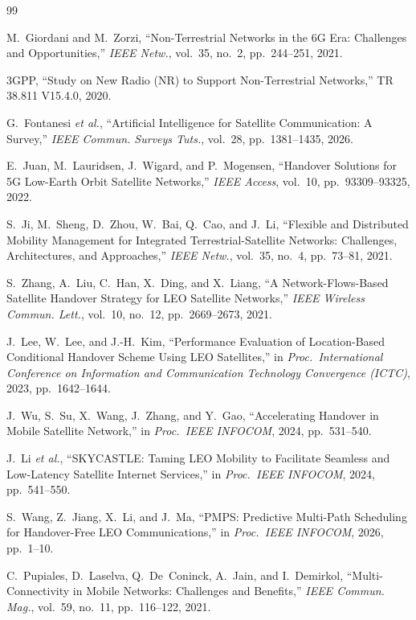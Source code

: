\documentclass[journal]{IEEEtran}
\begin{document}
\begin{thebibliography}{99}

M.~Giordani and M.~Zorzi, ``Non-Terrestrial Networks in the 6G Era: Challenges and Opportunities,'' \emph{IEEE Netw.}, vol.~35, no.~2, pp.~244--251, 2021.

3GPP, ``Study on New Radio (NR) to Support Non-Terrestrial Networks,'' TR 38.811 V15.4.0, 2020.

G.~Fontanesi \emph{et al.}, ``Artificial Intelligence for Satellite Communication: A Survey,'' \emph{IEEE Commun. Surveys Tuts.}, vol.~28, pp.~1381--1435, 2026.

E.~Juan, M.~Lauridsen, J.~Wigard, and P.~Mogensen, ``Handover Solutions for 5G Low-Earth Orbit Satellite Networks,'' \emph{IEEE Access}, vol.~10, pp.~93309--93325, 2022.

S.~Ji, M.~Sheng, D.~Zhou, W.~Bai, Q.~Cao, and J.~Li, ``Flexible and Distributed Mobility Management for Integrated Terrestrial-Satellite Networks: Challenges, Architectures, and Approaches,'' \emph{IEEE Netw.}, vol.~35, no.~4, pp.~73--81, 2021.

S.~Zhang, A.~Liu, C.~Han, X.~Ding, and X.~Liang, ``A Network-Flows-Based Satellite Handover Strategy for LEO Satellite Networks,'' \emph{IEEE Wireless Commun. Lett.}, vol.~10, no.~12, pp.~2669--2673, 2021.

J.~Lee, W.~Lee, and J.-H.~Kim, ``Performance Evaluation of Location-Based Conditional Handover Scheme Using LEO Satellites,'' in \emph{Proc.\ International Conference on Information and Communication Technology Convergence (ICTC)}, 2023, pp.~1642--1644.

J.~Wu, S.~Su, X.~Wang, J.~Zhang, and Y.~Gao, ``Accelerating Handover in Mobile Satellite Network,'' in \emph{Proc.\ IEEE INFOCOM}, 2024, pp.~531--540.

J.~Li \emph{et al.}, ``SKYCASTLE: Taming LEO Mobility to Facilitate Seamless and Low-Latency Satellite Internet Services,'' in \emph{Proc.\ IEEE INFOCOM}, 2024, pp.~541--550.

S.~Wang, Z.~Jiang, X.~Li, and J.~Ma, ``PMPS: Predictive Multi-Path Scheduling for Handover-Free LEO Communications,'' in \emph{Proc.\ IEEE INFOCOM}, 2026, pp.~1--10.

C.~Pupiales, D.~Laselva, Q.~De~Coninck, A.~Jain, and I.~Demirkol, ``Multi-Connectivity in Mobile Networks: Challenges and Benefits,'' \emph{IEEE Commun. Mag.}, vol.~59, no.~11, pp.~116--122, 2021.


\end{thebibliography}
\end{document}
